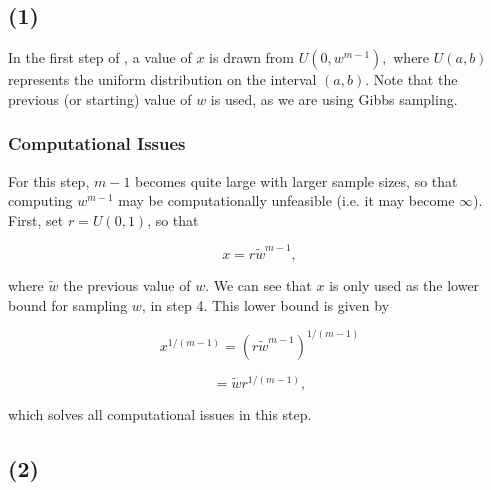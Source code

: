 \documentclass[12pt,a4paper]{article}
\begin{document}
\subsection{(1)}

In the first step of \citet{damien1999fullbayes}, a value of $x$ is drawn from $ U(0, w^{m-1}),$ where $U(a,b)$ represents the uniform distribution on the interval $(a, b)$. Note that the previous (or starting) value of $w$ is used, as we are using Gibbs sampling. 

\subsubsection*{Computational Issues}

For this step, $m-1$ becomes quite large with larger sample sizes, so that computing $w^{m-1}$ may be computationally unfeasible (i.e. it may become $\infty$). First, set $r = U(0,1)$, so that 

$$ x = r \tilde{w}^{m-1},$$

where $\tilde{w}$ the previous value of $w$. We can see that $x$ is only used as the lower bound for sampling $w$, in step 4. This lower bound is given by

$$ x^{1/(m-1)} = \left( r \tilde{w}^{m-1} \right)^{1/(m-1)} $$ 

$$ = \tilde{w} r^{1/(m-1)}, $$ 

which solves all computational issues in this step.


\subsection{(2)}

%
%
%
%
%
%
%
%
\end{document}
